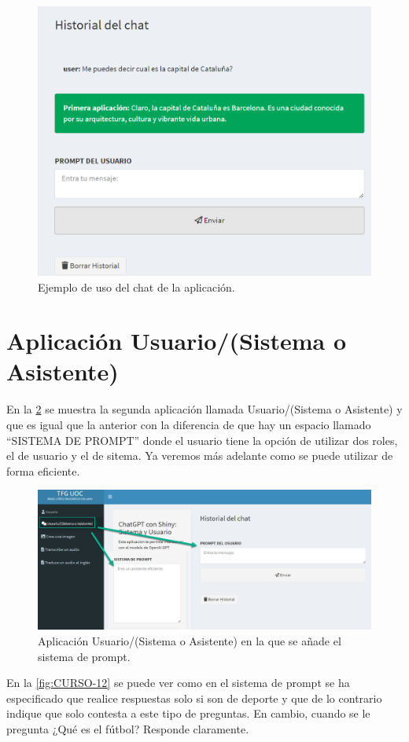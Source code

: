\documentclass[
]{book}
\begin{document}
\begin{figure}

{\centering \includegraphics[width=0.6\linewidth]{FIG11} 

}

\caption{Ejemplo de uso del chat de la aplicación.}\label{fig:CURSO-10}
\end{figure}

\section{Aplicación Usuario/(Sistema o Asistente)}\label{aplicaciuxf3n-usuariosistema-o-asistente}

En la \ref{fig:CURSO-11} se muestra la segunda aplicación llamada Usuario/(Sistema o Asistente) y que es igual que la anterior con la diferencia de que hay un espacio llamado ``SISTEMA DE PROMPT'' donde el usuario tiene la opción de utilizar dos roles, el de usuario y el de sitema. Ya veremos más adelante como se puede utilizar de forma eficiente.

\begin{figure}

{\centering \includegraphics[width=0.6\linewidth]{FIG12} 

}

\caption{Aplicación Usuario/(Sistema o Asistente) en la que se añade el sistema de prompt.}\label{fig:CURSO-11}
\end{figure}

En la \ref{fig:CURSO-12} se puede ver como en el sistema de prompt se ha especificado que realice respuestas solo si son de deporte y que de lo contrario indique que solo contesta a este tipo de preguntas. En cambio, cuando se le pregunta ¿Qué es el fútbol? Responde claramente.
\end{document}
